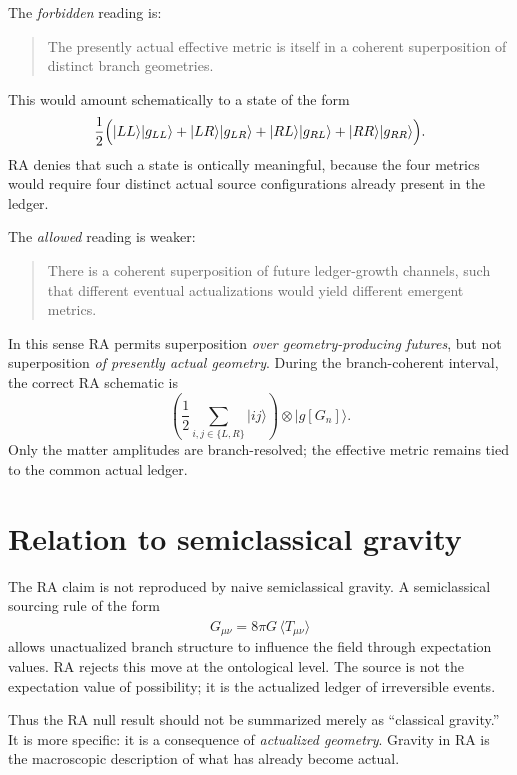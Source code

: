 \documentclass[11pt]{article}
\begin{document}
The \emph{forbidden} reading is:
\begin{quote}
The presently actual effective metric is itself in a coherent superposition of distinct branch geometries.
\end{quote}
This would amount schematically to a state of the form
\begin{equation}
\frac{1}{2}\Bigl(
|LL\rangle |g_{LL}\rangle
+
|LR\rangle |g_{LR}\rangle
+
|RL\rangle |g_{RL}\rangle
+
|RR\rangle |g_{RR}\rangle
\Bigr).
\end{equation}
RA denies that such a state is ontically meaningful, because the four metrics would require four distinct actual source configurations already present in the ledger.

The \emph{allowed} reading is weaker:
\begin{quote}
There is a coherent superposition of future ledger-growth channels, such that different eventual actualizations would yield different emergent metrics.
\end{quote}
In this sense RA permits superposition \emph{over geometry-producing futures}, but not superposition \emph{of presently actual geometry}. During the branch-coherent interval, the correct RA schematic is
\begin{equation}
\left(
\frac{1}{2}\sum_{i,j\in\{L,R\}} |ij\rangle
\right)
\otimes
|g[G_n]\rangle.
\end{equation}
Only the matter amplitudes are branch-resolved; the effective metric remains tied to the common actual ledger.

\section{Relation to semiclassical gravity}

The RA claim is not reproduced by naive semiclassical gravity. A semiclassical sourcing rule of the form
\begin{equation}
G_{\mu\nu} = 8\pi G\, \langle \hat{T}_{\mu\nu} \rangle
\end{equation}
allows unactualized branch structure to influence the field through expectation values. RA rejects this move at the ontological level. The source is not the expectation value of possibility; it is the actualized ledger of irreversible events.

Thus the RA null result should not be summarized merely as ``classical gravity.'' It is more specific: it is a consequence of \emph{actualized geometry}. Gravity in RA is the macroscopic description of what has already become actual.
\end{document}
